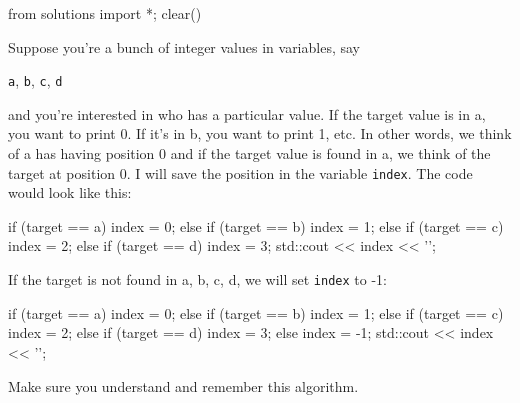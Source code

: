 \begin{python0}
from solutions import *; clear()
\end{python0}

Suppose you're a bunch of integer values in variables,
say
\begin{center}
\texttt{a}, \texttt{b}, \texttt{c}, \texttt{d}
\end{center}
and you're interested in who has a particular value. If
the target value is in a, you want to print 0. If it's
in b, you want to print 1, etc. In other words, we think of a has having
position 0 and if the target value is found in a, we think of the target
at position 0. I will save the position in the variable \texttt{index}.
The code would look like this:\\
\begin{console}
if (target == a)
{
    index = 0;
}
else if (target == b)
{
    index = 1;
}
else if (target == c)
{
    index = 2;
}
else if (target == d)
{
    index = 3;
}
std::cout << index << '\n';
\end{console}
If the target is not found in a, b, c, d, we will set \texttt{index} to -1:\\
\begin{console}
if (target == a)
{
    index = 0;
}
else if (target == b)
{
    index = 1;
}
else if (target == c)
{
    index = 2;
}
else if (target == d)
{
    index = 3;
}
else
{
    index = -1;
}
std::cout << index << '\n';
\end{console}


Make sure you understand and remember this algorithm.

